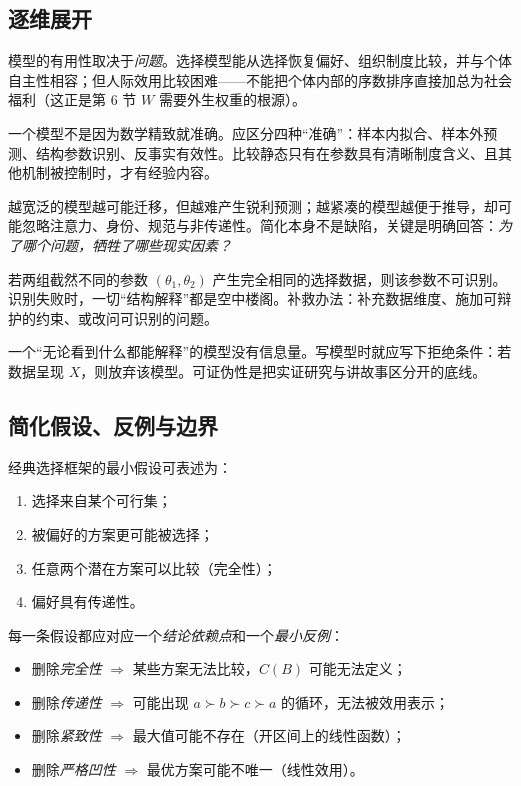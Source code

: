 \subsection{逐维展开}

模型的有用性取决于\emph{问题}。选择模型能从选择恢复偏好、组织制度比较，并与个体自主性相容；但人际效用比较困难——不能把个体内部的序数排序直接加总为社会福利（这正是第 6 节 $W$ 需要外生权重的根源）。

一个模型不是因为数学精致就准确。应区分四种“准确”：样本内拟合、样本外预测、结构参数识别、反事实有效性。比较静态只有在参数具有清晰制度含义、且其他机制被控制时，才有经验内容。

越宽泛的模型越可能迁移，但越难产生锐利预测；越紧凑的模型越便于推导，却可能忽略注意力、身份、规范与非传递性。简化本身不是缺陷，关键是明确回答：\emph{为了哪个问题，牺牲了哪些现实因素？}

若两组截然不同的参数 $(\theta_1,\theta_2)$ 产生完全相同的选择数据，则该参数不可识别。识别失败时，一切“结构解释”都是空中楼阁。补救办法：补充数据维度、施加可辩护的约束、或改问可识别的问题。

一个“无论看到什么都能解释”的模型没有信息量。写模型时就应写下拒绝条件：若数据呈现 $X$，则放弃该模型。可证伪性是把实证研究与讲故事区分开的底线。

\subsection{简化假设、反例与边界}

经典选择框架的最小假设可表述为：
\begin{enumerate}
  \item 选择来自某个可行集；
  \item 被偏好的方案更可能被选择；
  \item 任意两个潜在方案可以比较（完全性）；
  \item 偏好具有传递性。
\end{enumerate}

每一条假设都应对应一个\emph{结论依赖点}和一个\emph{最小反例}：
\begin{itemize}
  \item 删除\emph{完全性} $\Rightarrow$ 某些方案无法比较，$C(B)$ 可能无法定义；
  \item 删除\emph{传递性} $\Rightarrow$ 可能出现 $a\succ b\succ c\succ a$ 的循环，无法被效用表示；
  \item 删除\emph{紧致性} $\Rightarrow$ 最大值可能不存在（开区间上的线性函数）；
  \item 删除\emph{严格凹性} $\Rightarrow$ 最优方案可能不唯一（线性效用）。
\end{itemize}

